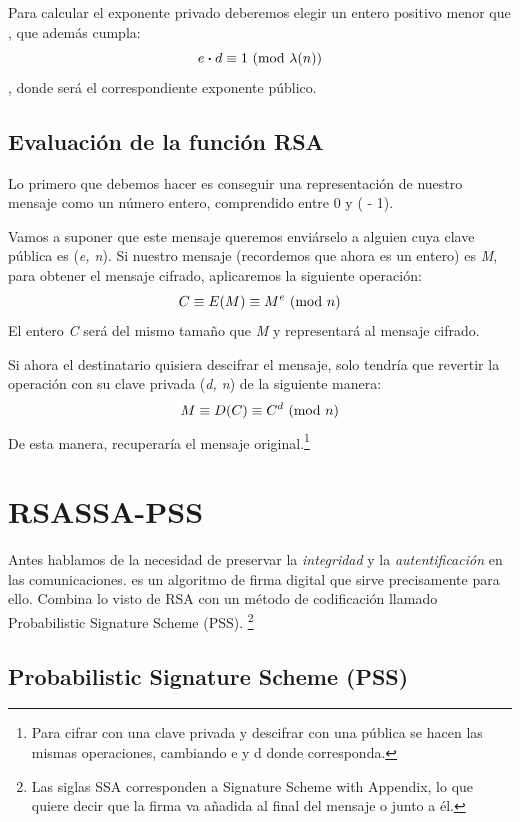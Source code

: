  Para calcular el exponente privado  deberemos elegir un entero positivo menor que , que además cumpla:
 \[ e \boldsymbol{\cdot} d \equiv 1 \ (\mathrm{mod}\ \lambda(n)) \]
 , donde  será el correspondiente exponente público. \emph{\parencite{Reference11}}

 \subsection{Evaluación de la función RSA}

 Lo primero que debemos hacer es conseguir una representación de nuestro mensaje como un número entero, comprendido entre 0 y ( - 1).

 Vamos a suponer que este mensaje queremos enviárselo a alguien cuya clave pública es (\emph{e, n}).
 Si nuestro mensaje (recordemos que ahora es un entero) es \emph{M}, para obtener el mensaje cifrado, aplicaremos la siguiente operación:
 \[ C \equiv E(M) \equiv M^e \ (\mathrm{mod}\ n) \]
 El entero \emph{C} será del mismo tamaño que \emph{M} y representará al mensaje cifrado.

 Si ahora el destinatario quisiera descifrar el mensaje, solo tendría que revertir la operación con su clave privada (\emph{d, n}) de la siguiente manera:
 \[ M \equiv D(C) \equiv C^d \ (\mathrm{mod}\ n) \]
 De esta manera, recuperaría el mensaje original.\footnote{Para cifrar con una clave privada y descifrar con una pública se hacen las mismas operaciones, cambiando e y d donde corresponda.} \emph{\parencite{Reference12}}


 \section{RSASSA-PSS}

 Antes hablamos de la necesidad de preservar la \emph{integridad} y la \emph{autentificación} en las comunicaciones.
  es un algoritmo de firma digital que sirve precisamente para ello.
 Combina lo visto de RSA con un método de codificación llamado Probabilistic Signature Scheme (PSS).
 \footnote{Las siglas SSA corresponden a Signature Scheme with Appendix, lo que quiere decir que la firma va añadida al final del mensaje o junto a él.}

 \subsection{Probabilistic Signature Scheme (PSS)}

